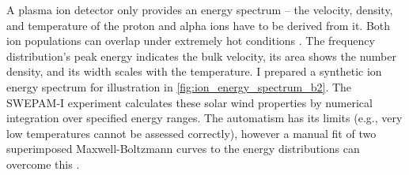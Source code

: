 A plasma ion detector only provides an energy spectrum -- the velocity, density, and temperature of the proton and alpha ions have to be derived from it. Both ion populations can overlap under extremely hot conditions \citep{Bame1992}. The frequency distribution's peak energy indicates the bulk velocity, its area shows the number density, and its width scales with the temperature. I prepared a synthetic ion energy spectrum for illustration in \autoref{fig:ion_energy_spectrum_b2}. The SWEPAM-I experiment calculates these solar wind properties by numerical integration over specified energy ranges. The automatism has its limits (e.g., very low temperatures cannot be assessed correctly), however a manual fit of two superimposed Maxwell-Boltzmann curves to the energy distributions can overcome this \citep{Bame1992}.


